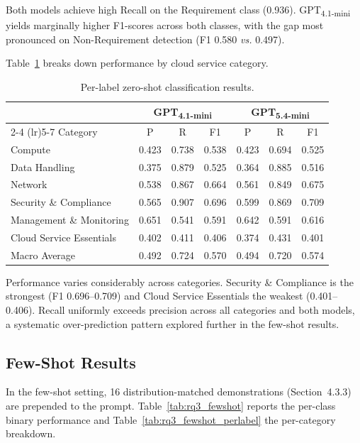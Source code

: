 Both models achieve high Recall on the Requirement class (0.936). GPT\textsubscript{4.1-mini} yields marginally higher F1-scores across both classes, with the gap most pronounced on Non-Requirement detection (F1 0.580 \textit{vs.} 0.497).

Table~\ref{tab:rq3_zeroshot_perlabel} breaks down performance by cloud service category.

\begin{table}[h]
\centering
\caption{Per-label zero-shot classification results.}
\label{tab:rq3_zeroshot_perlabel}
\footnotesize
\begin{tabular}{lcccccc}
\toprule
& \multicolumn{3}{c}{GPT\textsubscript{4.1-mini}} & \multicolumn{3}{c}{GPT\textsubscript{5.4-mini}} \\
\cmidrule(lr){2-4} \cmidrule(lr){5-7}
Category & P & R & F1 & P & R & F1 \\
\midrule
Compute                       & 0.423 & 0.738 & 0.538 & 0.423 & 0.694 & 0.525 \\
Data Handling                 & 0.375 & 0.879 & 0.525 & 0.364 & 0.885 & 0.516 \\
Network                       & 0.538 & 0.867 & 0.664 & 0.561 & 0.849 & 0.675 \\
Security \& Compliance         & 0.565 & 0.907 & 0.696 & 0.599 & 0.869 & 0.709 \\
Management \& Monitoring       & 0.651 & 0.541 & 0.591 & 0.642 & 0.591 & 0.616 \\
Cloud Service Essentials      & 0.402 & 0.411 & 0.406 & 0.374 & 0.431 & 0.401 \\
\midrule
Macro Average                 & 0.492 & 0.724 & 0.570 & 0.494 & 0.720 & 0.574 \\
\bottomrule
\end{tabular}
\end{table}

Performance varies considerably across categories. Security \& Compliance is the strongest (F1 0.696--0.709) and Cloud Service Essentials the weakest (0.401--0.406). Recall uniformly exceeds precision across all categories and both models, a systematic over-prediction pattern explored further in the few-shot results.

\subsection{Few-Shot Results}

In the few-shot setting, 16 distribution-matched demonstrations (Section~4.3.3) are prepended to the prompt. Table~\ref{tab:rq3_fewshot} reports the per-class binary performance and Table~\ref{tab:rq3_fewshot_perlabel} the per-category breakdown.

